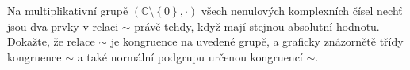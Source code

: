 \subsubsection{}
Na multiplikativní grupě $(\mathbb{C} \setminus \left \{ 0 \right \} ,\cdot )$
všech nenulových komplexních čísel nechť jsou dva prvky v relaci $\sim$ právě
tehdy, když mají stejnou absolutní hodnotu. Dokažte, že relace $\sim$ je
kongruence na uvedené grupě, a graficky znázornětě třídy kongruence $\sim$ a
také normální podgrupu určenou kongruencí $\sim$.
